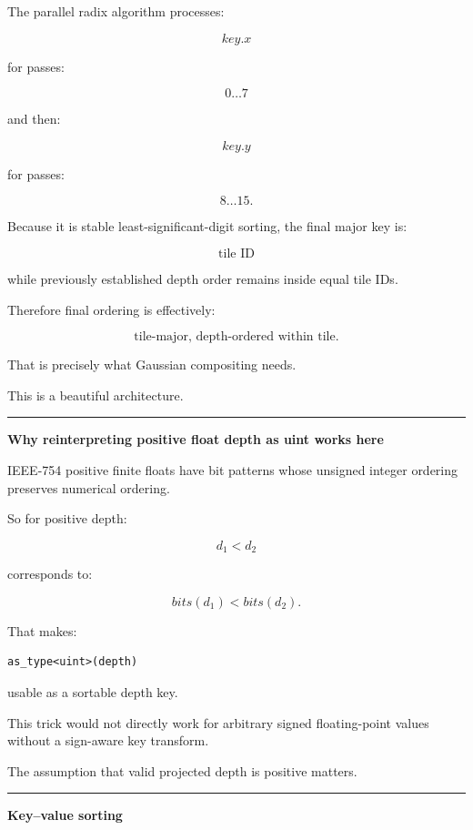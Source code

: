 The parallel radix algorithm processes:

\[
key.x
\]

for passes:

\[
0\dots7
\]

and then:

\[
key.y
\]

for passes:

\[
8\dots15.
\]

Because it is stable least-significant-digit sorting, the final major key is:

\[
\boxed{\text{tile ID}}
\]

while previously established depth order remains inside equal tile IDs.

Therefore final ordering is effectively:

\[
\boxed{
\text{tile-major, depth-ordered within tile}.
}
\]

That is precisely what Gaussian compositing needs.

This is a beautiful architecture.

\begin{center}\rule{0.5\linewidth}{0.5pt}\end{center}

\textbf{Why reinterpreting positive float depth as uint works here}

IEEE-754 positive finite floats have bit patterns whose unsigned integer ordering preserves numerical ordering.

So for positive depth:

\[
d_1<d_2
\]

corresponds to:

\[
bits(d_1)<bits(d_2).
\]

That makes:

\protect{}\label{brslup}%
\begin{verbatim}
as_type<uint>(depth)
\end{verbatim}

usable as a sortable depth key.

This trick would not directly work for arbitrary signed floating-point values without a sign-aware key transform.

The assumption that valid projected depth is positive matters.

\begin{center}\rule{0.5\linewidth}{0.5pt}\end{center}

\textbf{Key--value sorting}

